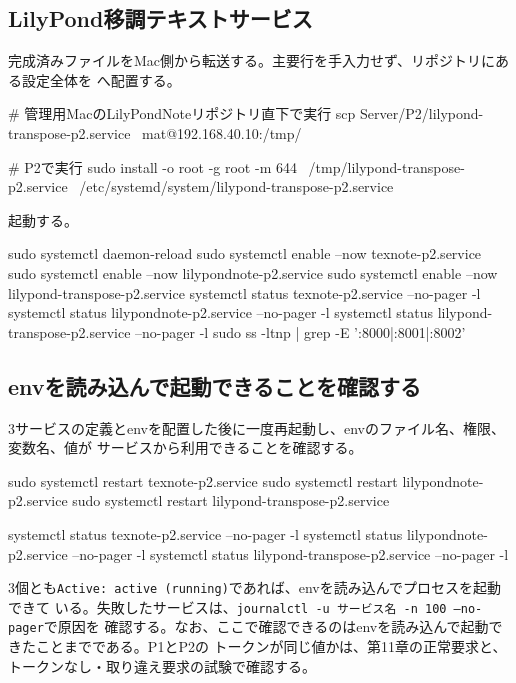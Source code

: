 \documentclass[uplatex,a4paper,11pt]{jsarticle}
\begin{document}
\subsection{LilyPond移調テキストサービス}

完成済みファイルをMac側から転送する。主要行を手入力せず、リポジトリにある設定全体を
へ配置する。

\begin{command}
# 管理用MacのLilyPondNoteリポジトリ直下で実行
scp Server/P2/lilypond-transpose-p2.service \
  mat@192.168.40.10:/tmp/

# P2で実行
sudo install -o root -g root -m 644 \
  /tmp/lilypond-transpose-p2.service \
  /etc/systemd/system/lilypond-transpose-p2.service
\end{command}



起動する。

\begin{command}
sudo systemctl daemon-reload
sudo systemctl enable --now texnote-p2.service
sudo systemctl enable --now lilypondnote-p2.service
sudo systemctl enable --now lilypond-transpose-p2.service
systemctl status texnote-p2.service --no-pager -l
systemctl status lilypondnote-p2.service --no-pager -l
systemctl status lilypond-transpose-p2.service --no-pager -l
sudo ss -ltnp | grep -E ':8000|:8001|:8002'
\end{command}

\subsection{envを読み込んで起動できることを確認する}

3サービスの定義とenvを配置した後に一度再起動し、envのファイル名、権限、変数名、値が
サービスから利用できることを確認する。

\begin{command}
sudo systemctl restart texnote-p2.service
sudo systemctl restart lilypondnote-p2.service
sudo systemctl restart lilypond-transpose-p2.service

systemctl status texnote-p2.service --no-pager -l
systemctl status lilypondnote-p2.service --no-pager -l
systemctl status lilypond-transpose-p2.service --no-pager -l
\end{command}

3個とも\texttt{Active: active (running)}であれば、envを読み込んでプロセスを起動できて
いる。失敗したサービスは、\texttt{journalctl -u サービス名 -n 100 --no-pager}で原因を
確認する。なお、ここで確認できるのはenvを読み込んで起動できたことまでである。P1とP2の
トークンが同じ値かは、第11章の正常要求と、トークンなし・取り違え要求の試験で確認する。
\end{document}
